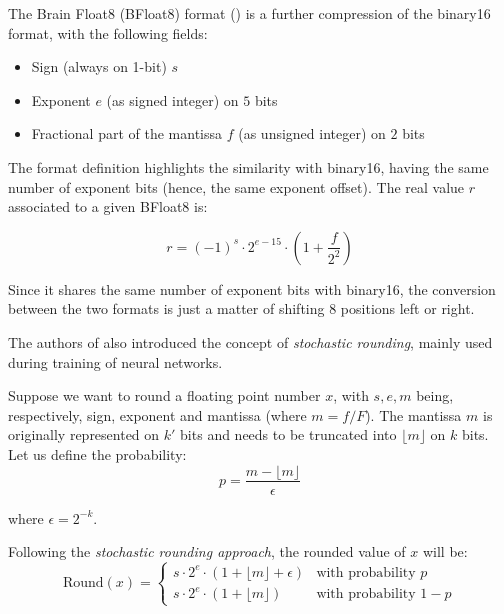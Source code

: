 The Brain Float8 (BFloat8) format (\cite{naveen2019mixed}) is a further compression of the binary16 format, with the following fields:

\begin{itemize}
    \item Sign (always on 1-bit) $s$
    \item Exponent $e$ (as signed integer) on $5$ bits
    \item Fractional part of the mantissa $f$ (as unsigned integer) on $2$ bits
\end{itemize}

The format definition highlights the similarity with binary16, having the same number of exponent bits (hence, the same exponent offset). The real value $r$ associated to a given BFloat8 is:

\begin{equation}\label{eqn:bfloat82real}
    r = (-1)^s \cdot 2^{e-15} \cdot \left(1 + \frac{f}{2^2} \right)
\end{equation}

Since it shares the same number of exponent bits with binary16, the conversion between the two formats is just a matter of shifting 8 positions left or right.

The authors of \cite{naveen2019mixed} also introduced the concept of \textit{stochastic rounding}, mainly used during training of neural networks.

Suppose we want to round a floating point number $x$, with $s,e,m$ being, respectively, sign, exponent and mantissa (where $m = f/F$). The mantissa $m$ is originally represented on $k'$ bits and needs to be truncated into $\lfloor m \rfloor$ on $k$ bits. Let us define the probability: 
\begin{equation}\label{eqn:bfloat8StochProb}
    p = \frac{m - \lfloor m \rfloor}{\epsilon}
\end{equation}

where $\epsilon = 2^{-k}$.

Following the \textit{stochastic rounding approach}, the rounded value of $x$ will be:
\begin{equation}\label{eqn:bfloat8Rounded}
\text{Round}(x) = 
\left\{\begin{matrix}
s \cdot 2^e \cdot ( 1 + \lfloor m \rfloor + \epsilon) & \text{with probability } p \\ 
s \cdot 2^e \cdot ( 1 + \lfloor m \rfloor) & \text{with probability } 1-p 
\end{matrix}\right.
\end{equation}

